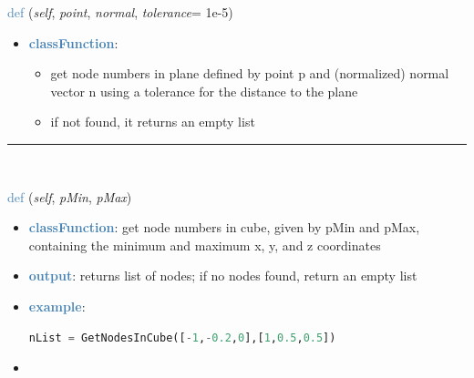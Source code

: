 \begin{itemize}[leftmargin=1.4cm]
\begin{itemize}[leftmargin=1.4cm]
\begin{itemize}[leftmargin=1.4cm]
\begin{itemize}[leftmargin=0.5cm]
\begin{itemize}[leftmargin=1.4cm]
\begin{itemize}[leftmargin=1.4cm]
\begin{itemize}[leftmargin=1.4cm]
\begin{itemize}[leftmargin=0.5cm]
\begin{flushleft}
\noindent \textcolor{steelblue}{def {\bf {}}}\label{sec:FEM:FEMinterface:GetNodesInPlane}
({\it self}, {\it point}, {\it normal}, {\it tolerance}= 1e-5)
\end{flushleft}
\setlength{\itemindent}{0.7cm}
\begin{itemize}[leftmargin=0.7cm]
\item[--]\textcolor{steelblue}{\bf classFunction}: \vspace{-6pt}
\begin{itemize}[leftmargin=1.2cm]
\setlength{\itemindent}{-0.7cm}
\item[]get node numbers in plane defined by point p and (normalized) normal vector n using a tolerance for the distance to the plane
\item[]if not found, it returns an empty list
\end{itemize}
\vspace{12pt}\end{itemize}
%
\noindent\rule{8cm}{0.75pt}\vspace{1pt} \\ 
\begin{flushleft}
\noindent \textcolor{steelblue}{def {\bf {}}}\label{sec:FEM:FEMinterface:GetNodesInCube}
({\it self}, {\it pMin}, {\it pMax})
\end{flushleft}
\setlength{\itemindent}{0.7cm}
\begin{itemize}[leftmargin=0.7cm]
\item[--]\textcolor{steelblue}{\bf classFunction}: get node numbers in cube, given by pMin and pMax, containing the minimum and maximum x, y, and z coordinates
\item[--]\textcolor{steelblue}{\bf output}: returns list of nodes; if no nodes found, return an empty list
\item[--]\textcolor{steelblue}{\bf example}: \vspace{-12pt}\ei\begin{lstlisting}[language=Python, xleftmargin=36pt]
  nList = GetNodesInCube([-1,-0.2,0],[1,0.5,0.5])
\end{lstlisting}\vspace{-24pt}\bi\item[]\vspace{-24pt}\vspace{12pt}\end{itemize}

\end{itemize}
\end{itemize}
\end{itemize}
\end{itemize}
\end{itemize}
\end{itemize}
\end{itemize}
\end{itemize}
